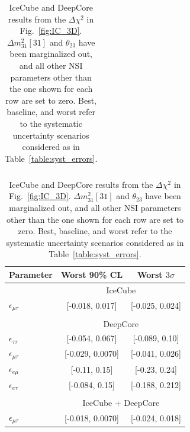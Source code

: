 \documentclass{article}
\newcommand{\emt}{\ensuremath{\epsilon_{\mu\tau}}}
\newcommand{\eet}{\epsilon_{e\tau}}
\newcommand{\eem}{\epsilon_{e\mu}}
\newcommand{\ett}{\ensuremath{\epsilon_{\tau\tau}}}
\newcommand{\dm}{\Delta m^2_{31}}
\begin{document}
{{\begin{table}
\begin{center}
\begin{tabular}{lcc}
       \end{tabular}
       \begin{tabular}{lcc}
          \hline
          Parameter & Worst 90\% CL & Worst $3\sigma$\\
          \hline & \multicolumn{2}{c}{IceCube}  \\
          $\emt$ &  [-0.018, 0.017] &  [-0.025, 0.024] \\\\
          & \multicolumn{2}{c}{DeepCore}\\ [0.3em]
          $\ett$ &  [-0.054, 0.067] &  [-0.089, 0.10] \\
          $\emt$ &  [-0.029, 0.0070] &  [-0.041, 0.026] \\
          $\eem$ &  [-0.11, 0.15] &  [-0.23, 0.24] \\
          $\eet$ &   [-0.084, 0.15] &  [-0.188, 0.212] \\\\
          &\multicolumn{2}{c}{IceCube + DeepCore}\\
          $\emt$ &  [-0.018, 0.0070] &  [-0.024, 0.018] \\
          \hline
       \end{tabular}
       \caption{IceCube and DeepCore results from the $\Delta \chi^2$ in Fig.~\ref{fig:IC_3D}. $\dm[31]$ and $\theta_{23}$ have been marginalized out, and all other NSI parameters other than the one shown for each row are set to zero. Best, baseline, and worst refer to 
       the systematic uncertainty scenarios considered as in Table~\ref{table:syst_errors}.}\label{table:IC_DC_results}
    \end{center}
 \end{table}
 
}}
\end{document}
